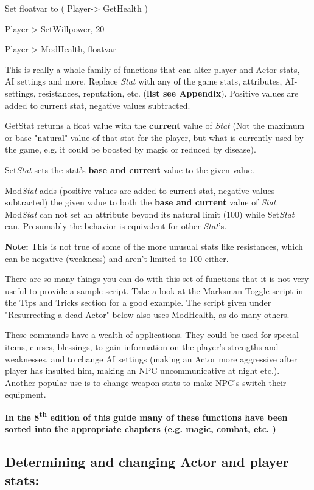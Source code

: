 Set floatvar to ( Player-> GetHealth )

Player-> SetWillpower, 20

Player-> ModHealth, floatvar

This is really a whole family of functions that can alter player and
Actor stats, AI settings and more. Replace \emph{Stat} with any of the
game stats, attributes, AI-settings, resistances, reputation, etc.
(\textbf{list see Appendix}). Positive values are added to current stat,
negative values subtracted.

GetStat returns a float value with the \textbf{current} value of
\emph{Stat} (Not the maximum or base "natural" value of that stat for
the player, but what is currently used by the game, e.g. it could be
boosted by magic or reduced by disease).

Set\emph{Stat} sets the stat's \textbf{base and current} value to the
given value.

Mod\emph{Stat} adds (positive values are added to current stat, negative
values subtracted) the given value to both the \textbf{base and current}
value of \emph{Stat}. Mod\emph{Stat} can not set an attribute beyond its
natural limit (100) while Set\emph{Stat} can. Presumably the behavior is
equivalent for other \emph{Stat}'s.

\textbf{Note:} This is not true of some of the more unusual stats like
resistances, which can be negative (weakness) and aren't limited to 100
either.

There are so many things you can do with this set of functions that it
is not very useful to provide a sample script. Take a look at the
Marksman Toggle script in the Tips and Tricks section for a good
example. The script given under "Resurrecting a dead Actor" below also
uses ModHealth, as do many others.

These commands have a wealth of applications. They could be used for
special items, curses, blessings, to gain information on the player's
strengths and weaknesses, and to change AI settings (making an Actor
more aggressive after player has insulted him, making an NPC
uncommunicative at night etc.). Another popular use is to change weapon
stats to make NPC's switch their equipment.

\textbf{In the 8\textsuperscript{th} edition of this guide many of these
functions have been sorted into the appropriate chapters (e.g. magic,
combat, etc. )}

\hypertarget{determining-and-changing-actor-and-player-stats}{%
\subsection{\texorpdfstring{\hfill\break
Determining and changing Actor and player
stats:}{ Determining and changing Actor and player stats:}}\label{determining-and-changing-actor-and-player-stats}}

